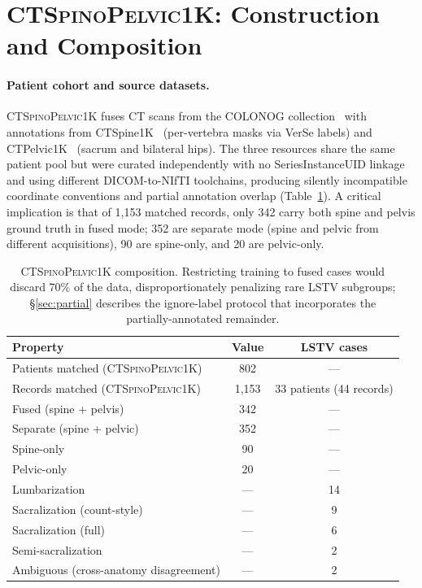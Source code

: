 \documentclass{article}
\newcommand{\dataset}{\textsc{CTSpinoPelvic1K}}
\begin{document}
\section{\dataset{}: Construction and Composition}
\label{sec:dataset}

\paragraph{Patient cohort and source datasets.}
\dataset{} fuses CT scans from the COLONOG
collection~\citep{Smith2015DataCOLONOGRAPHY} with annotations from
CTSpine1K~\citep{Deng2021CTSpine1K:Tomography} (per-vertebra masks via VerSe
labels) and CTPelvic1K~\citep{Liu2021DeepModels} (sacrum and bilateral
hips).
The three resources share the same patient pool but were curated
independently with no SeriesInstanceUID linkage and using
different DICOM-to-NIfTI toolchains, producing silently
incompatible coordinate conventions and partial annotation overlap
(Table~\ref{tab:scan_stats}).
A critical implication is that of 1{,}153 matched records, only
342 carry both spine and pelvis ground truth in fused mode;
352 are separate mode (spine and pelvic from different
acquisitions), 90 are spine-only, and 20 are pelvic-only.

\begin{table}[t]
\caption{\dataset{} composition. Restricting training to fused
cases would discard 70\% of the data, disproportionately
penalizing rare LSTV subgroups; \S\ref{sec:partial} describes the
ignore-label protocol that incorporates the
partially-annotated remainder.}
\label{tab:scan_stats}
\centering
\small
\begin{tabular}{lcc}
\toprule
\bfseries Property & \bfseries Value & \bfseries LSTV cases \\
\midrule
Patients matched (\dataset{})       & 802     & --- \\
Records matched (\dataset{})        & 1{,}153 & 33 patients (44 records) \\
\quad Fused (spine + pelvis)        & 342     & --- \\
\quad Separate (spine + pelvic)     & 352     & --- \\
\quad Spine-only                    & 90      & --- \\
\quad Pelvic-only                   & 20      & --- \\
\midrule
Lumbarization                       & ---     & 14 \\
Sacralization (count-style)         & ---     & 9 \\
Sacralization (full)                & ---     & 6 \\
Semi-sacralization                  & ---     & 2 \\
Ambiguous (cross-anatomy disagreement) & --- & 2 \\
\bottomrule
\end{tabular}
\end{table}
\end{document}
